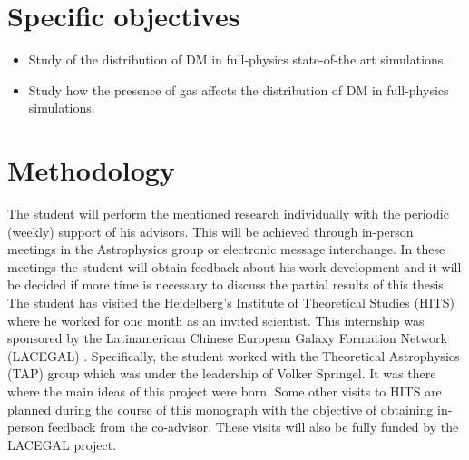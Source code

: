 \documentclass[12pt]{article}
\begin{document}
\section{Specific objectives}


\begin{itemize}
	\item Study of the distribution of DM in full-physics state-of-the art simulations.

	\item Study how the presence of gas affects the distribution of DM in full-physics simulations.
	
\end{itemize}

\section{Methodology}




The student will perform the mentioned research individually with the periodic (weekly) support of his advisors. This will be achieved through in-person meetings in the Astrophysics group or electronic message interchange. 
In these meetings the student will obtain feedback about his work development and it will be decided if more time is necessary to discuss the partial results of this thesis. \\


The student has visited  the Heidelberg's Institute of Theoretical Studies (HITS) where he worked for one month as an invited scientist.
This internship was sponsored by the Latinamerican Chinese European Galaxy Formation Network (LACEGAL) \cite{LACEGAL}. 
Specifically, the student worked with the Theoretical Astrophysics (TAP) group which was under the leadership of Volker Springel. 
It was there where the main ideas of this project were born.
 Some other visits to HITS are planned during the course of this monograph with the objective of obtaining in-person feedback from the co-advisor. 
These visits will also be fully funded by the LACEGAL project.\\
\end{document}
